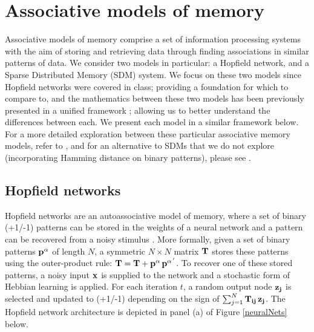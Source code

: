 \documentclass[10pt,letterpaper]{article}
\begin{document}








\section{Associative models of memory}

Associative models of memory comprise a set of information processing systems with the aim of storing and retrieving data through finding associations in similar patterns of data. We consider two models in particular: a Hopfield network, and a Sparse Distributed Memory (SDM) system. We focus on these two models since Hopfield networks were covered in class; providing a foundation for which to compare to, and the mathematics between these two models has been previously presented in a unified framework \cite{Keeler1988}; allowing us to better understand the differences between each.  We present each model in a similar framework below. For a more detailed exploration between these particular associative memory models, refer to , and for an alternative to SDMs that we do not explore (incorporating Hamming distance on binary patterns), please see .

\subsection{Hopfield networks}

Hopfield networks are an autoassociative model of memory, where a set of binary (+1/-1) patterns can be stored in the weights of a neural network and a pattern can be recovered from a noisy stimulus \cite{Hopfield1982}. More formally, given a set of binary patterns $\bf{p}^{\alpha}$ of length $N$, a symmetric $N \times N$ matrix $\bf{T}$ stores these patterns using the outer-product rule: $\bf{T} = \bf{T} + \bf{p}^{\alpha}\,\bf{p}^{\alpha\,'}$. To recover one of these stored patterns, a noisy input $\bf{x}$ is supplied to the network and a stochastic form of Hebbian learning is applied. For each  iteration $t$, a random output node $\bf{z}_{j}$ is selected and updated to (+1/-1) depending on the sign of $\sum_{j=1}^{N} \bf{T}_{ij}\,\bf{z}_{j}$. The Hopfield network architecture is depicted in panel (a) of Figure \ref{neuralNets} below.
\end{document}
